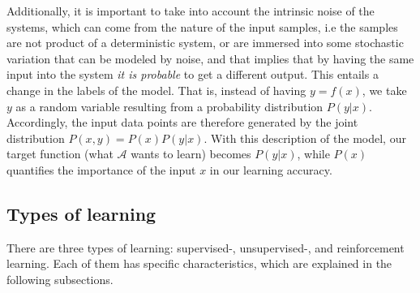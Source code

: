 Additionally, it is important to take into account the intrinsic noise of the systems, which can come from the nature of the input samples, i.e the samples are not product of a deterministic system, or are immersed into some stochastic variation that can be modeled by noise, and that implies that by having the same input into the system \emph{it is probable} to get a different output. This entails a change in the labels of the model. That is, instead of having \(y = f(x)\), we take \(y\) as a random variable resulting from a probability distribution \(P(y|x)\). Accordingly, the input data points are therefore generated by the joint distribution \(P(x,y) = P(x)P(y|x)\). With this description of the model, our target function (what \(\mathcal{A}\) wants to learn) becomes \(P(y|x)\), while \(P(x)\) quantifies the importance of the input \(x\) in our learning accuracy.

\subsection{Types of learning}\label{ch:learning_types}

There are three types of learning: supervised-, unsupervised-, and reinforcement learning. Each of them has specific characteristics, which are explained in the following subsections.

